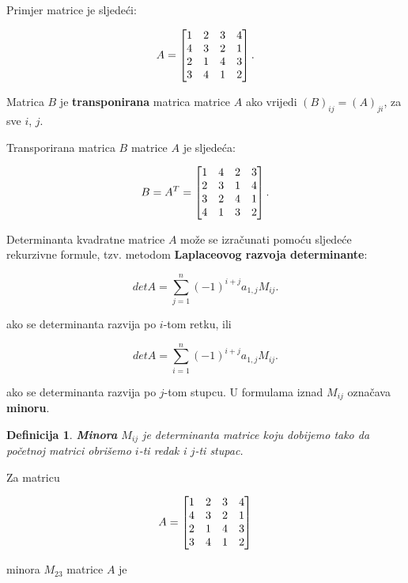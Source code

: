 \documentclass[times, utf8, zavrsni]{fer}
\newtheorem{definition}{Definicija}[chapter]
\begin{document}
Primjer matrice je sljedeći:

\[
\centering
A = 
\begin{bmatrix}
	1 & 2 & 3 & 4 \\
	4 & 3 & 2 & 1 \\
	2 & 1 & 4 & 3 \\
	3 & 4 & 1 & 2
\end{bmatrix}.
\]

Matrica $B$ je \textbf{transponirana} matrica matrice $A$ ako vrijedi $(B)_{ij} = (A)_{ji}$, za sve $i$, $j$.

Transporirana matrica $B$ matrice $A$ je sljedeća:

\[
\centering
B = A^T =
\begin{bmatrix}
	1 & 4 & 2 & 3\\
	2 & 3 & 1 & 4\\
	3 & 2 & 4 & 1\\
	4 & 1 & 3 & 2 
\end{bmatrix}.
\]

Determinanta kvadratne matrice $A$ može se izračunati pomoću sljedeće rekurzivne formule, tzv. metodom \textbf{Laplaceovog razvoja determinante}:

\begin{equation}
	detA = \sum_{j = 1}^{n} (-1)^{i+j} a_{1,j} M_{ij}.
\end{equation}

ako se determinanta razvija po $i$-tom retku, ili

\begin{equation}
	detA = \sum_{i = 1}^{n} (-1)^{i+j} a_{1,j} M_{ij}.
\end{equation}

ako se determinanta razvija po $j$-tom stupcu. U formulama iznad $M_{ij}$ označava \textbf{minoru}.

\begin{definition}
	\textbf{Minora} $M_{ij}$ je determinanta matrice koju dobijemo tako da početnoj matrici obrišemo $i$-ti redak i $j$-ti stupac.
\end{definition}

Za matricu

\[
\centering
A = 
\begin{bmatrix}
	1 & 2 & 3 & 4 \\
	4 & 3 & 2 & 1 \\
	2 & 1 & 4 & 3 \\
	3 & 4 & 1 & 2
\end{bmatrix}
\]

minora $M_{23}$ matrice $A$ je
\end{document}
